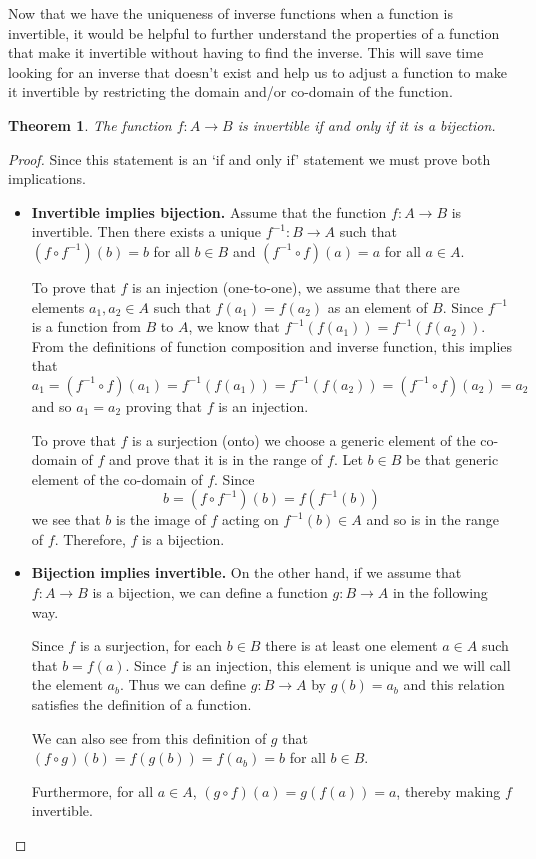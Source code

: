 \documentclass[
]{book}
\newtheorem{theorem}{Theorem}[chapter]
\theoremstyle{definition}
\theoremstyle{definition}
\theoremstyle{definition}
\theoremstyle{definition}
\theoremstyle{remark}
\begin{document}
Now that we have the uniqueness of inverse functions when a function is invertible, it would be helpful to further understand the properties of a function that make it invertible without having to find the inverse. This will save time looking for an inverse that doesn't exist and help us to adjust a function to make it invertible by restricting the domain and/or co-domain of the function.

\begin{theorem}
\protect\hypertarget{thm:bijection}{}\label{thm:bijection}The function \(f:A \rightarrow B\) is invertible if and only if it is a bijection.
\end{theorem}

\begin{proof}

Since this statement is an `if and only if' statement we must prove both implications.

\begin{itemize}
\item
  \textbf{Invertible implies bijection.} Assume that the function \(f:A \rightarrow B\) is invertible. Then there exists a unique \(f^{-1}:B\rightarrow A\) such that \((f\circ f^{-1})(b)=b\) for all \(b\in B\) and \((f^{-1}\circ f)(a)=a\) for all \(a\in A\).

  To prove that \(f\) is an injection (one-to-one), we assume that there are elements \(a_1, a_2\in A\) such that \(f(a_1)=f(a_2)\) as an element of \(B\). Since \(f^{-1}\) is a function from \(B\) to \(A\), we know that \(f^{-1}(f(a_1))=f^{-1}(f(a_2))\). From the definitions of function composition and inverse function, this implies that \[a_1 = (f^{-1}\circ f)(a_1)= f^{-1}(f(a_1))=f^{-1}(f(a_2))= (f^{-1}\circ f)(a_2)=a_2\] and so \(a_1=a_2\) proving that \(f\) is an injection.

  To prove that \(f\) is a surjection (onto) we choose a generic element of the co-domain of \(f\) and prove that it is in the range of \(f\). Let \(b\in B\) be that generic element of the co-domain of \(f\). Since \[b = (f\circ f^{-1})(b) = f(f^{-1}(b))\] we see that \(b\) is the image of \(f\) acting on \(f^{-1}(b) \in A\) and so is in the range of \(f\). Therefore, \(f\) is a bijection.
\item
  \textbf{Bijection implies invertible.} On the other hand, if we assume that \(f:A\rightarrow B\) is a bijection, we can define a function \(g: B \rightarrow A\) in the following way.

  Since \(f\) is a surjection, for each \(b\in B\) there is at least one element \(a\in A\) such that \(b=f(a)\). Since \(f\) is an injection, this element is unique and we will call the element \(a_b\). Thus we can define \(g:B\rightarrow A\) by \(g(b)=a_b\) and this relation satisfies the definition of a function.

  We can also see from this definition of \(g\) that \((f\circ g)(b)=f(g(b))=f(a_b)=b\) for all \(b\in B\).

  Furthermore, for all \(a\in A\), \((g \circ f)(a) = g(f(a))=a\), thereby making \(f\) invertible.
\end{itemize}

\end{proof}
\end{document}
